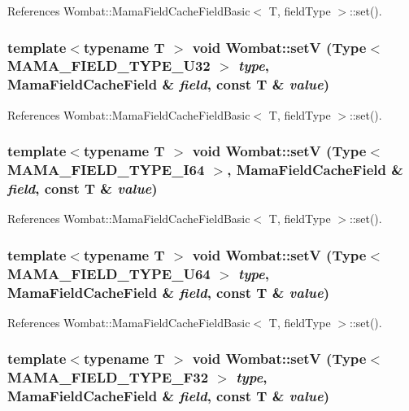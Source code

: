 References Wombat::MamaFieldCacheFieldBasic$<$ T, fieldType $>$::set().\hypertarget{namespaceWombat_a2790b16dcc36f8a2bd67fd28656fca96}{
\subsubsection[{setV}]{\setlength{\rightskip}{0pt plus 5cm}template$<$typename T $>$ void Wombat::setV (Type$<$ MAMA\_\-FIELD\_\-TYPE\_\-U32 $>$ {\em type}, \/  MamaFieldCacheField \& {\em field}, \/  const T \& {\em value})}}
\label{namespaceWombat_a2790b16dcc36f8a2bd67fd28656fca96}


References Wombat::MamaFieldCacheFieldBasic$<$ T, fieldType $>$::set().\hypertarget{namespaceWombat_a0ff960f8e1e43ec81311b3a9c7659be7}{
\subsubsection[{setV}]{\setlength{\rightskip}{0pt plus 5cm}template$<$typename T $>$ void Wombat::setV (Type$<$ MAMA\_\-FIELD\_\-TYPE\_\-I64 $>$, \/  MamaFieldCacheField \& {\em field}, \/  const T \& {\em value})}}
\label{namespaceWombat_a0ff960f8e1e43ec81311b3a9c7659be7}


References Wombat::MamaFieldCacheFieldBasic$<$ T, fieldType $>$::set().\hypertarget{namespaceWombat_a48256649aa74f7146958e4186fa9d693}{
\subsubsection[{setV}]{\setlength{\rightskip}{0pt plus 5cm}template$<$typename T $>$ void Wombat::setV (Type$<$ MAMA\_\-FIELD\_\-TYPE\_\-U64 $>$ {\em type}, \/  MamaFieldCacheField \& {\em field}, \/  const T \& {\em value})}}
\label{namespaceWombat_a48256649aa74f7146958e4186fa9d693}


References Wombat::MamaFieldCacheFieldBasic$<$ T, fieldType $>$::set().\hypertarget{namespaceWombat_ae501feefba00a32661b4913f50aa4e03}{
\subsubsection[{setV}]{\setlength{\rightskip}{0pt plus 5cm}template$<$typename T $>$ void Wombat::setV (Type$<$ MAMA\_\-FIELD\_\-TYPE\_\-F32 $>$ {\em type}, \/  MamaFieldCacheField \& {\em field}, \/  const T \& {\em value})}}
\label{namespaceWombat_ae501feefba00a32661b4913f50aa4e03}


